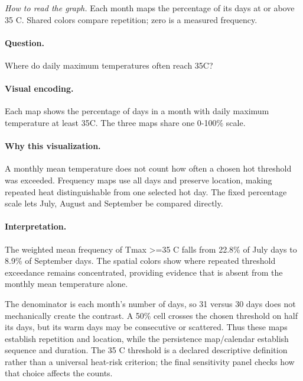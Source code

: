 \documentclass[conference,a4paper]{IEEEtran}
\begin{document}
\noindent\textit{How to read the graph.} Each month maps the percentage of its days at or above 35 C. Shared colors compare repetition; zero is a measured frequency.

\paragraph{Question.} Where do daily maximum temperatures often reach 35\textdegree{}C?



\paragraph{Visual encoding.} Each map shows the percentage of days in a month with daily maximum temperature at least 35\textdegree{}C. The three maps share one 0-100\% scale.



\paragraph{Why this visualization.} A monthly mean temperature does not count how often a chosen hot threshold was exceeded. Frequency maps use all days and preserve location, making repeated heat distinguishable from one selected hot day. The fixed percentage scale lets July, August and September be compared directly.



\paragraph{Interpretation.} The weighted mean frequency of Tmax >=35 C falls from 22.8\% of July days to 8.9\% of September days. The spatial colors show where repeated threshold exceedance remains concentrated, providing evidence that is absent from the monthly mean temperature alone.

The denominator is each month's number of days, so 31 versus 30 days does not mechanically create the contrast. A 50\% cell crosses the chosen threshold on half its days, but its warm days may be consecutive or scattered. Thus these maps establish repetition and location, while the persistence map/calendar establish sequence and duration. The 35 C threshold is a declared descriptive definition rather than a universal heat-risk criterion; the final sensitivity panel checks how that choice affects the counts.
\end{document}
